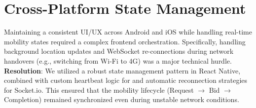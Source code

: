 \section{Cross-Platform State Management}
Maintaining a consistent UI/UX across Android and iOS while handling real-time mobility states required a complex frontend orchestration. Specifically, handling background location updates and WebSocket re-connections during network handovers (e.g., switching from Wi-Fi to 4G) was a major technical hurdle.
\textbf{Resolution}: We utilized a robust state management pattern in React Native, combined with custom heartbeat logic for and automatic reconnection strategies for Socket.io. This ensured that the mobility lifecycle (Request $\rightarrow$ Bid $\rightarrow$ Completion) remained synchronized even during unstable network conditions.